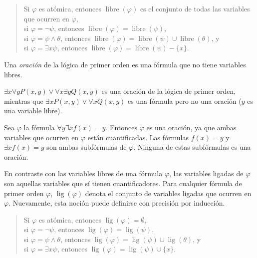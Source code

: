 \documentclass[12pt,a4paper]{book}
\DeclareMathOperator{\libre}{libre}
\DeclareMathOperator{\lig}{lig}
\begin{document}
    \begin{quote}
        Si $\varphi$ es atómica, entonces $\libre(\varphi)$ es el conjunto de todas las variables que ocurren en $\varphi$,\\
        si $\varphi=\neg\psi$, entonces $\libre(\varphi)=\libre(\psi)$,\\
        si $\varphi=\psi\wedge\theta$, entonces $\libre(\varphi)=\libre(\psi)\cup\libre(\theta)$, y\\
        si $\varphi=\exists x\psi$, entonces $\libre(\varphi)=\libre(\psi)-\{x\}$.
    \end{quote}

    \begin{definicion}[Oración]\label{def:sentencia}
        Una \textit{oración} de la lógica de primer orden es una fórmula que no tiene variables libres.
    \end{definicion}

    \begin{ejemplo}
        $\exists x\forall yP(x,y)\vee\forall x\exists yQ(x,y)$ es una oración de la lógica de primer orden, mientras que
        $\exists xP(x,y)\vee\forall xQ(x,y)$ es una fórmula pero no una oración ($y$ es una variable libre).
    \end{ejemplo}

    \begin{ejemplo}
        Sea $\varphi$ la fórmula $\forall y\exists xf(x)=y$. Entonces $\varphi$ es una oración, ya que ambas variables que
        ocurren en $\varphi$ están cuantificadas. Las fórmulas $f(x)=y$ y $\exists xf(x)=y$ son ambas subfórmulas de
        $\varphi$. Ninguna de estas subfórmulas es una oración.
    \end{ejemplo}

    En contraste con las variables libres de una fórmula $\varphi$, las variables ligadas de $\varphi$ son aquellas
    variables que sí tienen cuantificadores. Para cualquier fórmula de primer orden $\varphi$, $\lig(\varphi)$ denota el
    conjunto de variables ligadas que ocurren en $\varphi$. Nuevamente, esta noción puede definirse con precisión por
    inducción.

    \begin{quote}
        Si $\varphi$ es atómica, entonces $\lig(\varphi)=\emptyset$,\\
        si $\varphi=\neg\psi$, entonces $\lig(\varphi)=\lig(\psi)$,\\
        si $\varphi=\psi\wedge\theta$, entonces $\lig(\varphi)=\lig(\psi)\cup\lig(\theta)$, y\\
        si $\varphi=\exists x\psi$, entonces $\lig(\varphi)=\lig(\psi)\cup\{x\}$.
    \end{quote}
\end{document}
